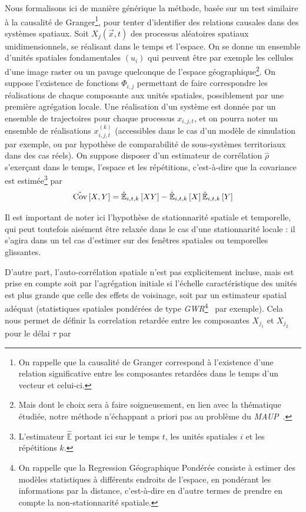 {Nous formalisons ici de manière générique la méthode, basée sur un test similaire à la causalité de Granger\footnote{On rappelle que la causalité de Granger correspond à l'existence d'une relation significative entre les composantes retardées dans le temps d'un vecteur et celui-ci.}, pour tenter d'identifier des relations causales dans des systèmes spatiaux. Soit $X_j(\vec{x},t)$ des processus aléatoires spatiaux unidimensionnels, se réalisant dans le temps et l'espace. On se donne un ensemble d'unités spatiales fondamentales $(u_i)$ qui peuvent être par exemple les cellules d'une image raster ou un pavage quelconque de l'espace géographique\footnote{Mais dont le choix sera à faire soigneusement, en lien avec la thématique étudiée, notre méthode n'échappant a priori pas au problème du \emph{MAUP}~\cite{paez2005spatial}.}. On suppose l'existence de fonctions $\Phi_{i,j}$ permettant de faire correspondre les réalisations de chaque composante aux unités spatiales, possiblement par une première agrégation locale. Une réalisation d'un système est donnée par un ensemble de trajectoires pour chaque processus $x_{i,j,t}$, et on pourra noter un ensemble de réalisations $x^{(k)}_{i,j,t}$ (accessibles dans le cas d'un modèle de simulation par exemple, ou par hypothèse de comparabilité de sous-systèmes territoriaux dans des cas réels). On suppose disposer d'un estimateur de corrélation $\hat{\rho}$ s'exerçant dans le temps, l'espace et les répétitions, c'est-à-dire que la covariance est estimée\footnote{L'estimateur $\hat{\mathbb{E}}$ portant ici sur le temps $t$, les unités spatiales $i$ et les répétitions $k$.} par
\[
\hat{\operatorname{Cov}}\left[X,Y\right] = \hat{\mathbb{E}}_{i,t,k}\left[XY\right] - \hat{\mathbb{E}}_{i,t,k}\left[X\right]\hat{\mathbb{E}}_{i,t,k}\left[Y\right]
\]

Il est important de noter ici l'hypothèse de stationnarité spatiale et temporelle, qui peut toutefois aisément être relaxée dans le cas d'une stationnarité locale : il s'agira dans un tel cas d'estimer sur des fenêtres spatiales ou temporelles glissantes.

D'autre part, l'auto-corrélation spatiale n'est pas explicitement incluse, mais est prise en compte soit par l'agrégation initiale si l'échelle caractéristique des unités est plus grande que celle des effets de voisinage, soit par un estimateur spatial adéquat (statistiques spatiales pondérées de type \emph{GWR}\footnote{On rappelle que la Regression Géographique Pondérée consiste à estimer des modèles statistiques à différents endroits de l'espace, en pondérant les informations par la distance, c'est-à-dire en d'autre termes de prendre en compte la non-stationnarité spatiale.}~\cite{brunsdon1998geographically} par exemple). Cela nous permet de définir la correlation retardée entre les composantes $X_{j_1}$ et $X_{j_2}$ pour le délai $\tau$ par
}

